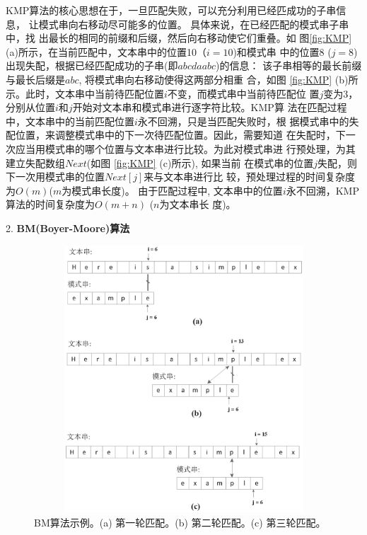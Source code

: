 KMP算法的核心思想在于，一旦匹配失败，可以充分利用已经匹成功的子串信息，
让模式串向右移动尽可能多的位置。 具体来说，在已经匹配的模式串子串中，找
出最长的相同的前缀和后缀，然后向右移动使它们重叠。如
图\ref{fig:KMP}(a)所示，在当前匹配中，文本串中的位置10（$i=10$)和模式串
中的位置8 ($j=8$)出现失配，根据已经匹配成功的子串(即$abcdaabc$)的信息：
该子串相等的最长前缀与最长后缀是$abc$, 将模式串向右移动使得这两部分相重
合，如图 \ref{fig:KMP}
(b)所示。此时，文本串中当前待匹配位置$i$不变，而模式串中当前待匹配位
置$j$变为3，分别从位置$i$和$j$开始对文本串和模式串进行逐字符比较。KMP算
法在匹配过程中，文本串中的当前匹配位置$i$永不回溯，只是当匹配失败时，根
据模式串中的失配位置，来调整模式串中的下一次待匹配位置。因此，需要知道
在失配时，下一次应当用模式串的哪个位置与文本串进行比较。为此对模式串进
行预处理，为其建立失配数组$Next$(如图 \ref{fig:KMP} (c)所示), 如果当前
在模式串的位置$j$失配，则下一次用模式串的位置$Next[j]$来与文本串进行比
较，预处理过程的时间复杂度为$O(m)$($m$为模式串长度)。 由于匹配过程中,
文本串中的位置$i$永不回溯，KMP算法的时间复杂度为$O(m+n)$ ($n$为文本串长
度)。

\vspace{0.4cm} 2. \textbf{BM(Boyer-Moore)算法}

\begin{figure}[H]
  \centering
  \includegraphics[height=10cm ,width=12cm]{figures/1_Introduction/BM.eps}
  \caption{BM算法示例。(a) 第一轮匹配。(b) 第二轮匹配。(c) 第三轮匹配。}
  \label{fig:BM}
\end{figure}

